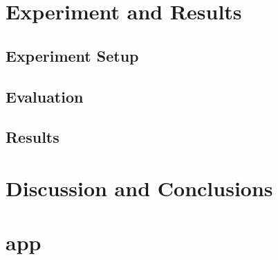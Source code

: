 \documentclass[12pt,final,twoside]{report}
\theoremstyle{plain}
\theoremstyle{definition}
\theoremstyle{remark}
\begin{document}
\cleardoublepage
\chapter{Experiment and Results}
\section{Experiment Setup}

\section{Evaluation}
\section{Results}

\cleardoublepage
\chapter{Discussion and Conclusions}

\cleardoublepage
\appendix
\fancyhead[LO,RE]{}                      %

\chapter{app}

\cleardoublepage




\cleardoublepage

\vspace{2cm}
\end{document}
